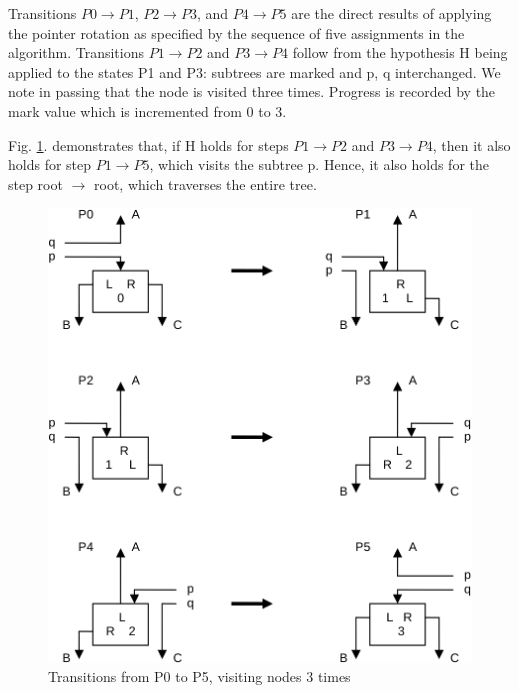 Transitions $P0 \rightarrow P1$, $P2 \rightarrow P3$, and $P4 \rightarrow P5$ are the direct results of applying the pointer rotation
as specified by the sequence of five assignments in the algorithm. Transitions $P1 \rightarrow P2$ and $P3 \rightarrow P4$ follow from the hypothesis H being applied to the states P1 and P3: subtrees are marked and p,
q interchanged. We note in passing that the node is visited three times. Progress is recorded by the
mark value which is incremented from 0 to 3.

Fig. \ref{fig:transition-3-times}. demonstrates that, if H holds for steps $P1 \rightarrow P2$ and $P3 \rightarrow P4$, then it also holds for step
$P1 \rightarrow P5$, which visits the subtree p. Hence, it also holds for the step root $\rightarrow$ root, which traverses
the entire tree.
\begin{figure}
	\label{fig:transition-3-times}
	\centering
	\includegraphics[width=.9\textwidth]{i/v}
	\caption{Transitions from P0 to P5, visiting nodes 3 times}
\end{figure}

